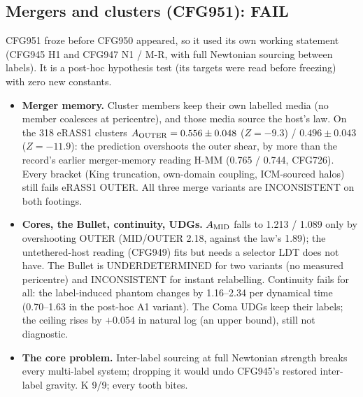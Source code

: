 \documentclass[10pt]{article}
\begin{document}
\subsection{Mergers and clusters (CFG951): FAIL}
CFG951 froze before CFG950 appeared, so it used its own working statement (CFG945 H1 and CFG947 N1 / M-R, with full Newtonian sourcing between labels). It is a post-hoc hypothesis test (its targets were read before freezing) with zero new constants.
\begin{itemize}
\item \textbf{Merger memory.} Cluster members keep their own labelled media (no member coalesces at pericentre), and those media source the host's law. On the 318 eRASS1 clusters $A_{\rm OUTER}=0.556\pm0.048$ ($Z=-9.3$) / $0.496\pm0.043$ ($Z=-11.9$): the prediction overshoots the outer shear, by more than the record's earlier merger-memory reading H-MM (0.765 / 0.744, CFG726). Every bracket (King truncation, own-domain coupling, ICM-sourced halos) still fails eRASS1 OUTER. All three merge variants are INCONSISTENT on both footings.
\item \textbf{Cores, the Bullet, continuity, UDGs.} $A_{\rm MID}$ falls to 1.213 / 1.089 only by overshooting OUTER (MID/OUTER 2.18, against the law's 1.89); the untethered-host reading (CFG949) fits but needs a selector LDT does not have. The Bullet is UNDERDETERMINED for two variants (no measured pericentre) and INCONSISTENT for instant relabelling. Continuity fails for all: the label-induced phantom changes by 1.16--2.34 per dynamical time (0.70--1.63 in the post-hoc A1 variant). The Coma UDGs keep their labels; the ceiling rises by $+0.054$ in natural log (an upper bound), still not diagnostic.
\item \textbf{The core problem.} Inter-label sourcing at full Newtonian strength breaks every multi-label system; dropping it would undo CFG945's restored inter-label gravity. K 9/9; every tooth bites.
\end{itemize}
\end{document}

